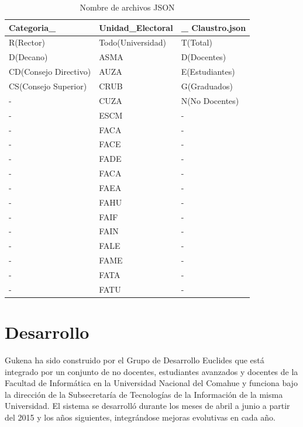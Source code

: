 \begin{table}[htbp]
\begin{center}
\begin{tabular}{|l|l|l|}
\hline
Categoria\_ & Unidad\_Electoral & \_ Claustro.json\\
\hline \hline 
R(Rector) & Todo(Universidad) & T(Total)\\ \hline
D(Decano) & ASMA & D(Docentes)\\ \hline
CD(Consejo Directivo) & AUZA & E(Estudiantes)\\ \hline
CS(Consejo Superior) & CRUB & G(Graduados)\\ \hline
-& CUZA & N(No Docentes) \\ \hline
-& ESCM &- \\ \hline
-& FACA &- \\ \hline
-& FACE &- \\ \hline
-& FADE &- \\ \hline
-& FACA &- \\ \hline
-& FAEA &- \\ \hline
-& FAHU &- \\ \hline
-& FAIF &- \\ \hline
-& FAIN &- \\ \hline
-& FALE &- \\ \hline
-& FAME &- \\ \hline
-& FATA &- \\ \hline
-& FATU &- \\ \hline
\end{tabular}
\end{center}
\caption{Nombre de archivos JSON}
\label{tab:formatoJSON}
\end{table}

\section{Desarrollo}
Gukena ha sido construido por el Grupo de Desarrollo Euclides \cite{euclides} que está integrado por un conjunto de no docentes, estudiantes avanzados y docentes de la Facultad de Informática en la Universidad Nacional del Comahue y funciona bajo la dirección de la Subsecretaría de Tecnologías de la Información de la misma Universidad. El sistema se desarrolló durante los meses de abril a junio a partir del 2015 y los años siguientes, integrándose mejoras evolutivas en cada año.

